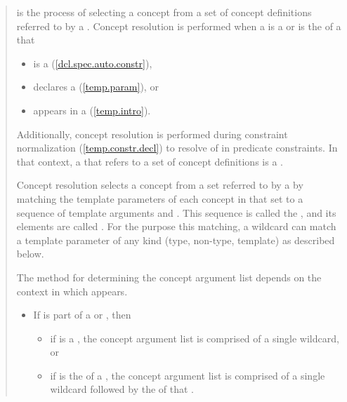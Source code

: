 \begin{quote}
\pnum
{} is the process of selecting a concept 
from a set of concept definitions referred to by a 
.
% 
Concept resolution is performed when a  
is a  or is the  
of a  that
\begin{itemize}
\item is a  (\ref{dcl.spec.auto.constr}), 
\item declares a  (\ref{temp.param}), or 
\item appears in a  (\ref{temp.intro}).
\end{itemize}
% 
% 
Additionally, concept resolution is performed during constraint normalization 
(\ref{temp.constr.decl}) to resolve  of
 in predicate constraints. 
% 
In that context, a  that refers to a set of concept 
definitions is a .

\pnum
Concept resolution selects a concept from a set referred to by a
 by matching the template parameters of each 
concept in that set to a sequence of template arguments and .
% 
This sequence is called the , and its elements
are called .
% 
For the purpose this matching, a wildcard can match a template 
parameter of any kind (type, non-type, template) as described below.

\pnum
The method for determining the concept argument list depends on the
context in which   appears.
% 
\begin{itemize}
\item If  is part of a  or 
,
then
  \begin{itemize}
  \item if  is a , the concept 
  argument list is comprised of a single wildcard, or
  \item if  is the  of a 
  , the concept argument list is comprised of a
  single wildcard followed by the  of that 
  .
  \end{itemize}


\end{itemize}
\end{quote}
